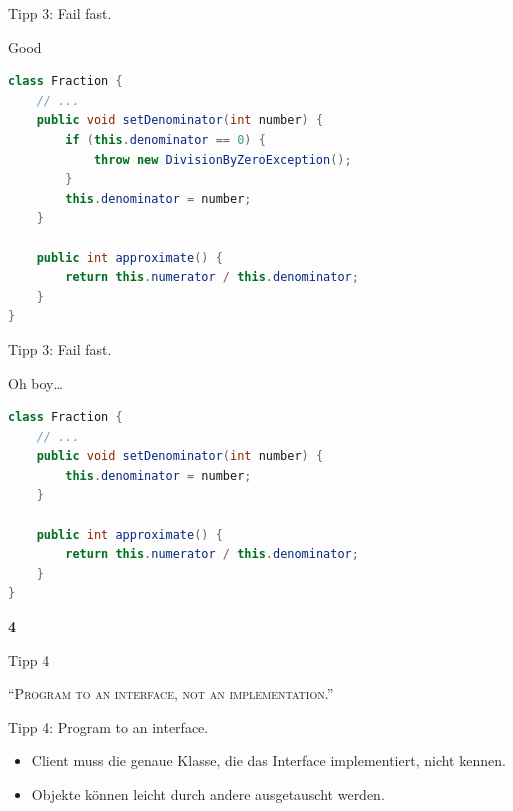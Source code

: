 \documentclass[18pt]{beamer}
\newcommand{\quotes}[1]{``#1''}
\begin{document}
\begin{frame}[fragile]{Tipp 3: Fail fast.}
    \begin{exampleblock}{Good}
        \begin{lstlisting}[language=Java,basicstyle=\scriptsize]
class Fraction {
    // ...
    public void setDenominator(int number) {
        if (this.denominator == 0) {
            throw new DivisionByZeroException();
        }
        this.denominator = number;
    }

    public int approximate() {
        return this.numerator / this.denominator;
    }
}
        \end{lstlisting}
    \end{exampleblock}
\end{frame}

\begin{frame}[fragile]{Tipp 3: Fail fast.}
    \begin{alertblock}{Oh boy\dots}
        \begin{lstlisting}[language=Java,basicstyle=\scriptsize]
class Fraction {
    // ...
    public void setDenominator(int number) {
        this.denominator = number;
    }

    public int approximate() {
        return this.numerator / this.denominator;
    }
}
        \end{lstlisting}
    \end{alertblock}
\end{frame}

\begin{frame}{\quad}
    \center
    \Huge{\textbf{4}}
\end{frame}

\begin{frame}{Tipp 4}
    \begin{block}{}
        \center
        \textsc{\quotes{Program to an interface, not an implementation.}}
    \end{block}
\end{frame}

\begin{frame}{Tipp 4: Program to an interface.}
    \begin{itemize}
        \item Client muss die genaue Klasse, die das Interface implementiert, nicht kennen.
        \item Objekte können leicht durch andere ausgetauscht werden.
    \end{itemize}
\end{frame}
\end{document}

